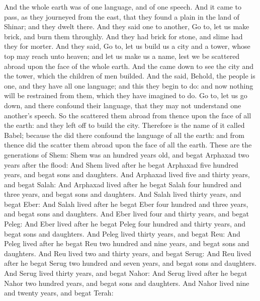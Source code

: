 \begin{biblechapter} %
 And the whole earth was of one language, and of one speech.
\verse And it came to pass, as they journeyed from the east, that they found a plain in the land of Shinar; and they dwelt there.
\verse And they said one to another, Go to, let us make brick, and burn them throughly. And they had brick for stone, and slime had they for morter.
\verse And they said, Go to, let us build us a city and a tower, whose top may reach unto heaven; and let us make us a name, lest we be scattered abroad upon the face of the whole earth.
\verse And the \LORD came down to see the city and the tower, which the children of men builded.
\verse And the \LORD said, Behold, the people is one, and they have all one language; and this they begin to do: and now nothing will be restrained from them, which they have imagined to do.
\verse Go to, let us go down, and there confound their language, that they may not understand one another's speech.
\verse So the \LORD scattered them abroad from thence upon the face of all the earth: and they left off to build the city.
\verse Therefore is the name of it called Babel; because the \LORD did there confound the language of all the earth: and from thence did the \LORD scatter them abroad upon the face of all the earth.
 These are the generations of Shem: Shem was an hundred years old, and begat Arphaxad two years after the flood:
\verse And Shem lived after he begat Arphaxad five hundred years, and begat sons and daughters.
\verse And Arphaxad lived five and thirty years, and begat Salah:
\verse And Arphaxad lived after he begat Salah four hundred and three years, and begat sons and daughters.
\verse And Salah lived thirty years, and begat Eber:
\verse And Salah lived after he begat Eber four hundred and three years, and begat sons and daughters.
\verse And Eber lived four and thirty years, and begat Peleg:
\verse And Eber lived after he begat Peleg four hundred and thirty years, and begat sons and daughters.
\verse And Peleg lived thirty years, and begat Reu:
\verse And Peleg lived after he begat Reu two hundred and nine years, and begat sons and daughters.
\verse And Reu lived two and thirty years, and begat Serug:
\verse And Reu lived after he begat Serug two hundred and seven years, and begat sons and daughters.
\verse And Serug lived thirty years, and begat Nahor:
\verse And Serug lived after he begat Nahor two hundred years, and begat sons and daughters.
\verse And Nahor lived nine and twenty years, and begat Terah:

\end{biblechapter}
